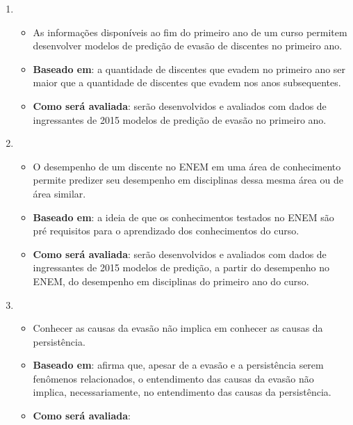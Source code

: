 \begin{enumerate}

\item 

	\begin{itemize}

		\item As informações disponíveis ao fim do primeiro ano de um curso permitem desenvolver modelos de predição de evasão de discentes no primeiro ano.
		\item \textbf{Baseado em}: a quantidade de discentes que evadem no primeiro ano ser maior que a quantidade de discentes que evadem nos anos subsequentes. 
		\item \textbf{Como será avaliada}: serão desenvolvidos e avaliados com dados de ingressantes de 2015 modelos de predição de evasão no primeiro ano.

	\end{itemize}
	
\item 

	\begin{itemize}

		\item O desempenho de um discente no ENEM em uma área de conhecimento permite predizer seu desempenho em disciplinas dessa mesma área ou de área similar.
		\item \textbf{Baseado em}: a ideia de que os conhecimentos testados no ENEM são pré requisitos para o aprendizado dos conhecimentos do curso.
		\item \textbf{Como será avaliada}: serão desenvolvidos e avaliados com dados de ingressantes de 2015 modelos de predição, a partir do desempenho no ENEM, do desempenho em disciplinas do primeiro ano do curso.

	\end{itemize}
	
\item 

	\begin{itemize}

		\item Conhecer as causas da evasão não implica em conhecer as causas da persistência.
		\item \textbf{Baseado em}: \cite{Tinto_completing} afirma que, apesar de a evasão e a persistência serem fenômenos relacionados, o entendimento das causas da evasão não implica, necessariamente, no entendimento das causas da persistência.
		\item \textbf{Como será avaliada}: 


\end{itemize}
\end{enumerate}

